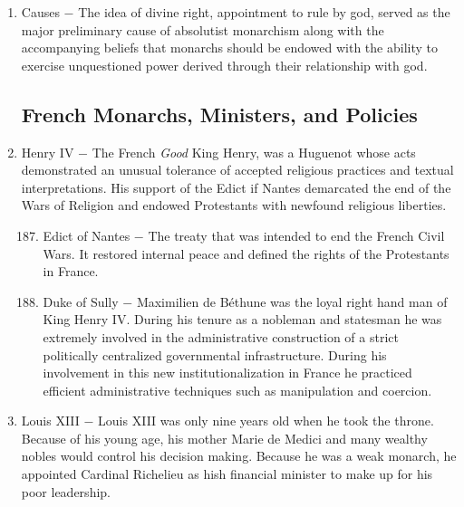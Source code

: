 \documentclass[12pt]{article}
\begin{document}
\begin{enumerate}
\item Causes $-$ The idea of divine right, appointment to rule by god, served as the major preliminary cause of absolutist monarchism along with the accompanying beliefs that monarchs should be endowed with the ability to exercise unquestioned power derived through their relationship with god.

\subsection{French Monarchs, Ministers, and Policies}

\item Henry IV $-$ The French \textit{Good} King Henry, was a Huguenot whose acts demonstrated an unusual tolerance of accepted religious practices and textual interpretations. His support of the Edict if Nantes demarcated the end of the Wars of Religion and endowed Protestants with newfound religious liberties.

\begin{enumerate}[label=\arabic{*}.]
\setcounter{enumii}{186}

\item Edict of Nantes $-$ The treaty that was intended to end the French Civil Wars. It restored internal peace and defined the rights of the Protestants in France. %

\item Duke of Sully $-$ Maximilien de B\'ethune was the loyal right hand man of King Henry IV. During his tenure as a nobleman and statesman he was extremely involved in the administrative construction of a strict politically centralized governmental infrastructure. During his involvement in this new institutionalization in France he practiced efficient administrative techniques such as manipulation and coercion. 

\end{enumerate} 
\setcounter{enumi}{188}

\item Louis XIII $-$ Louis XIII was only nine years old when he took the throne. Because of his young age, his mother Marie de Medici and many wealthy nobles would control his decision making. Because he was a weak monarch, he appointed Cardinal Richelieu as hish financial minister to make up for his poor leadership.

\begin{enumerate}[label=\arabic{*}.]
\setcounter{enumii}{189}


\end{enumerate}
\end{enumerate}
\end{document}

